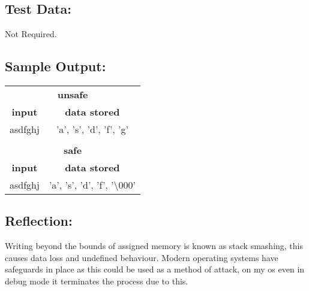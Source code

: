 \documentclass[Lab-B.tex]{subfiles}
\begin{document}
        \subsection*{Test Data:}
            Not Required.
        
        \subsection*{Sample Output:}
            \begin{center}
                \begin{tabular}{c c}
                    \hline
                    \multicolumn{2}{c}{\textbf{unsafe}} \\
                    \textbf{input} & \textbf{data stored} \\
                    \hline
                    asdfghj & 'a', 's', 'd', 'f', 'g' \\
                    \\
                    \hline
                    \multicolumn{2}{c}{\textbf{safe}} \\
                    \textbf{input} & \textbf{data stored} \\
                    \hline
                    asdfghj & 'a', 's', 'd', 'f', '\textbackslash000' \\
                    
                \end{tabular}
            \end{center}

        \subsection*{Reflection:}
            Writing beyond the bounds of assigned memory is known as stack smashing,
            this causes data loss and undefined behaviour. Modern operating systems
            have safeguards in place as this could be used as a method of attack,
            on my os even in debug mode it terminates the process due to this.    
\end{document}
